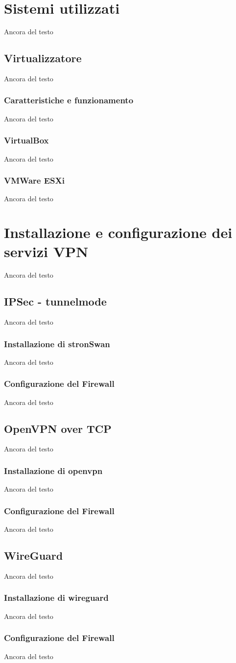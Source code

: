 \section{Sistemi utilizzati}
Ancora del testo

\subsection{Virtualizzatore}
Ancora del testo

\subsubsection{Caratteristiche e funzionamento}
Ancora del testo
\subsubsection{VirtualBox}
Ancora del testo
\subsubsection{VMWare ESXi}
Ancora del testo


\section{Installazione e configurazione dei servizi VPN}
Ancora del testo

\subsection{IPSec - tunnelmode}
Ancora del testo
\subsubsection{Installazione di stronSwan}
Ancora del testo
\subsubsection{Configurazione del Firewall}
Ancora del testo

\subsection{OpenVPN over TCP}
Ancora del testo
\subsubsection{Installazione di openvpn}
Ancora del testo
\subsubsection{Configurazione del Firewall}
Ancora del testo

\subsection{WireGuard}
Ancora del testo
\subsubsection{Installazione di wireguard}
Ancora del testo
\subsubsection{Configurazione del Firewall}
Ancora del testo